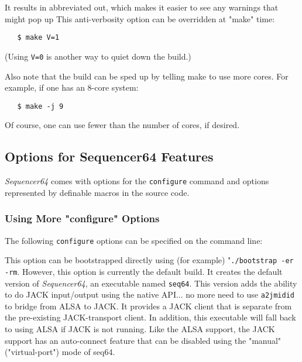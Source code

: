    It results in abbreviated out, which makes it easier to see
   any warnings that might pop up
   This anti-verbosity option can be overridden at "make" time:

\begin{verbatim}
   $ make V=1
\end{verbatim}

   (Using \texttt{V=0} is another way to quiet down the build.)

   Also note that the build can be sped up by telling make to use more cores.
   For example, if one has an 8-core system:

\begin{verbatim}
   $ make -j 9
\end{verbatim}

   Of course, one can use fewer than the number of cores, if desired.

\subsection{Options for Sequencer64 Features}
\label{subsec:seq64_build_options}

   \textsl{Sequencer64} comes with options for the \texttt{configure} command
   and options represented by definable macros in the source code.

\subsubsection{Using More "configure" Options}
\label{subsubsec:seq64_build_configure}

   The following \texttt{configure} options can be specified on the command
   line:

   \setcounter{ItemCounter}{0}      %

        This option can be bootstrapped directly using (for example)
        "\texttt{./bootstrap -er -rm}.
        However, this option is currently the default build.  It creates
        the default version of \textsl{Sequencer64}, an executable named
        \texttt{seq64}.  This version adds the ability to do JACK input/output
        using the native API... no more need to use \texttt{a2jmidid} to
        bridge from ALSA to JACK.  It provides a JACK client that is separate
        from the pre-existing JACK-transport client. In addition, this
        executable will fall back to using ALSA if JACK is not running.  
        Like the ALSA support, the JACK support has an auto-connect feature
        that can be disabled using the "manual" ("virtual-port") mode of seq64.

